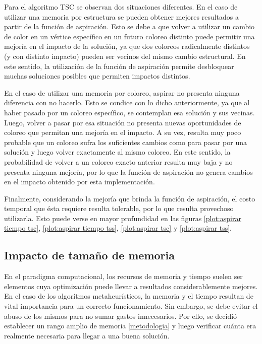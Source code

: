 Para el algoritmo TSC se observan dos situaciones diferentes. En el caso de utilizar una memoria por estructura se pueden obtener mejores resultados a partir de la función de aspiración. Esto se debe a que volver a utilizar un cambio de color en un vértice específico en un futuro coloreo distinto puede permitir una mejoría en el impacto de la solución, ya que dos coloreos radicalmente distintos (y con distinto impacto) pueden ser vecinos del mismo cambio estructural. En este sentido, la utilización de la función de aspiración permite desbloquear muchas soluciones posibles que permiten impactos distintos.

En el caso de utilizar una memoria por coloreo, aspirar no presenta ninguna diferencia con no hacerlo. Esto se condice con lo dicho anteriormente, ya que al haber pasado por un coloreo específico, se contemplan esa solución y sus vecinas. Luego, volver a pasar por esa situación no presenta nuevas oportunidades de coloreo que permitan una mejoría en el impacto. A su vez, resulta muy poco probable que un coloreo sufra los suficientes cambios como para pasar por una solución y luego volver exactamente al mismo coloreo. En este sentido, la probabilidad de volver a un coloreo exacto anterior resulta muy baja y no presenta ninguna mejoría, por lo que la función de aspiración no genera cambios en el impacto obtenido por esta implementación.

Finalmente, considerando la mejoría que brinda la función de aspiración, el costo temporal que ésta requiere resulta tolerable, por lo que resulta provechoso utilizarla. Esto puede verse en mayor profundidad en las figuras \ref{plot:aspirar tiempo tsc}, \ref{plot:aspirar tiempo tss}, \ref{plot:aspirar tsc} y \ref{plot:aspirar tss}.
 
\subsection{Impacto de tamaño de memoria}

En el paradigma computacional, los recursos de memoria y tiempo suelen ser elementos cuya optimización puede llevar a resultados considerablemente mejores. En el caso de los algorítmos metaheurísticos, la memoria y el tiempo resultan de vital importancia para un correcto funcionamiento. Sin embargo, se debe evitar el abuso de los mismos para no sumar gastos innecesarios. Por ello, se decidió establecer un rango amplio de memoria \ref{metodologia} y luego verificar cuánta era realmente necesaria para llegar a una buena solución.

